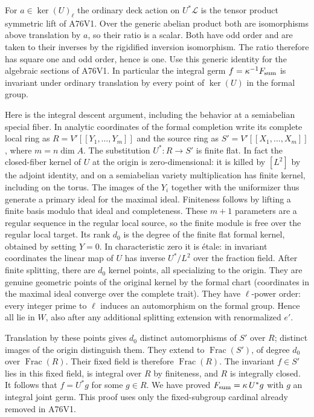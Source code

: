 For $a\in\ker(U)_\ell$ the ordinary deck action on $U^*\mathcal L$
is the tensor product symmetric lift of A76V1. Over the generic
abelian product both are isomorphisms above translation by $a$,
so their ratio is a scalar. Both have odd order and are taken
to their inverses by the rigidified inversion isomorphism.
The ratio therefore has square one and odd order, hence is one.
Use this generic identity for the algebraic sections of A76V1.
In particular the integral germ $f=\kappa^{-1}F_{\rm sum}$
is invariant under ordinary translation by every point of
$\ker(U)$ in the formal group.

Here is the integral descent argument, including the behavior at
a semiabelian special fiber. In analytic coordinates of the
formal completion write its complete local ring as
$R=V'[[Y_1,\ldots,Y_m]]$ and the source ring as
$S'=V'[[X_1,\ldots,X_m]]$, where $m=n\dim A$.
The substitution $U^*:R\to S'$ is finite flat. In fact the
closed-fiber kernel of $U$ at the origin is zero-dimensional:
it is killed by $[L^2]$ by the adjoint identity, and on a
semiabelian variety multiplication has finite kernel, including
on the torus. The images of the $Y_i$ together with the
uniformizer thus generate a primary ideal for the maximal ideal.
Finiteness follows by lifting a finite basis modulo that ideal
and completeness. These $m+1$ parameters are a regular sequence
in the regular local source, so the finite module is free over
the regular local target. Its rank $d_0$ is the degree of the
finite flat formal kernel, obtained by setting $Y=0$. In
characteristic zero it is \'etale: in invariant coordinates the
linear map of $U$ has inverse $U^*/L^2$ over the fraction field.
After finite splitting, there are $d_0$ kernel points, all
specializing to the origin. They are genuine geometric points
of the original kernel by the formal chart (coordinates in the
maximal ideal converge over the complete trait). They have
$\ell$-power order: every integer prime to $\ell$ induces an
automorphism on the formal group. Hence all lie in $W$, also
after any additional splitting extension with renormalized $e'$.

Translation by these points gives $d_0$ distinct automorphisms
of $S'$ over $R$; distinct images of the origin distinguish
them. They extend to $\operatorname{Frac}(S')$, of degree
$d_0$ over $\operatorname{Frac}(R)$. Their fixed field is
therefore $\operatorname{Frac}(R)$. The invariant $f\in S'$
lies in this fixed field, is integral over $R$ by finiteness,
and $R$ is integrally closed. It follows that $f=U^*g$ for
some $g\in R$. We have proved
$F_{\rm sum}=\kappa\,U^*g$ with $g$ an integral joint germ.
This proof uses only the fixed-subgroup cardinal already
removed in A76V1.

